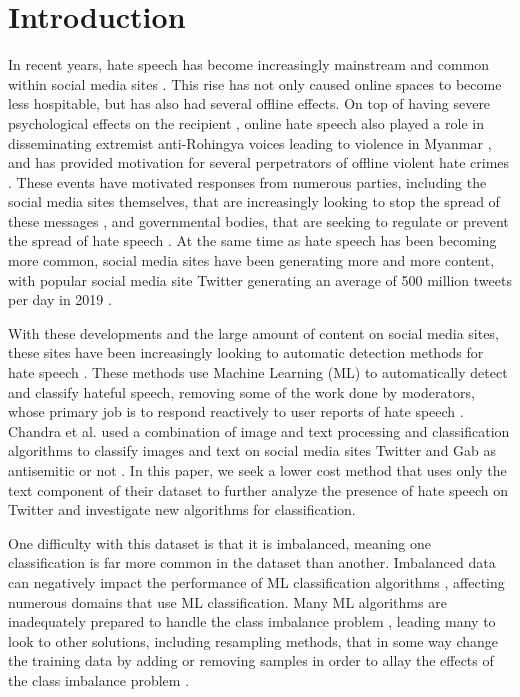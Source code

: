 \documentclass[runningheads]{llncs}
\begin{document}
\section{Introduction}
In recent years, hate speech has become increasingly mainstream and common within social media sites \cite{siegel}. This rise has not only caused online spaces to become less hospitable, but has also had several offline effects. On top of having severe psychological effects on the recipient \cite{siegel}, online hate speech also played a role in disseminating extremist anti-Rohingya voices leading to violence in Myanmar \cite{green}, and has provided motivation for several perpetrators of offline violent hate crimes \cite{siegel}. These events have motivated responses from numerous parties, including the social media sites themselves, that are increasingly looking to stop the spread of these messages \cite{ullmann}, and governmental bodies, that are seeking to regulate or prevent the spread of hate speech \cite{banks}. At the same time as hate speech has been becoming more common, social media sites have been generating more and more content, with popular social media site Twitter generating an average of 500 million tweets per day in 2019 \cite{pereira}.

With these developments and the large amount of content on social media sites, these sites have been increasingly looking to automatic detection methods for hate speech \cite{ullmann}. These methods use Machine Learning (ML) to automatically detect and classify hateful speech, removing some of the work done by moderators, whose primary job is to respond reactively to user reports of hate speech \cite{ullmann}. Chandra et al. \cite{chandra} used a combination of image and text processing and classification algorithms to classify images and text on social media sites Twitter and Gab as antisemitic or not \cite{chandra}. In this paper, we seek a lower cost method that uses only the text component of their dataset to further analyze the presence of hate speech on Twitter and investigate new algorithms for classification.

One difficulty with this dataset is that it is imbalanced, meaning one classification is far more common in the dataset than another. Imbalanced data can negatively impact the performance of ML classification algorithms \cite{sun}, affecting numerous domains that use ML classification. Many ML algorithms are inadequately prepared to handle the class imbalance problem \cite{sun}, leading many to look to other solutions, including resampling methods, that in some way change the training data by adding or removing samples in order to allay the effects of the class imbalance problem \cite{japkowicz}.
\end{document}
